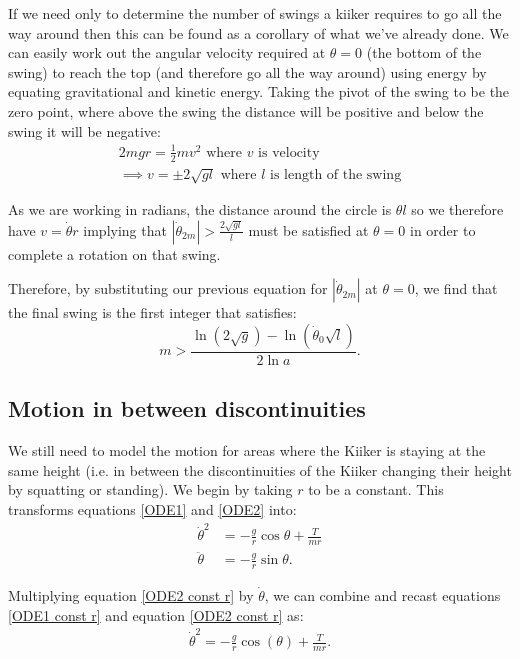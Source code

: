 \documentclass[12pt]{article}
\begin{document}
If we need only to determine the number of swings a kiiker requires to go all the way around then this can be found as a corollary of what we've already done. We can easily work out the angular velocity required at $\theta = 0$ (the bottom of the swing) to reach the top (and therefore go all the way around) using energy by equating gravitational and kinetic energy. Taking the pivot of the swing to be the zero point, where above the swing the distance will be positive and below the swing it will be negative:
\begin{align}
    2mgr = \frac{1}{2}mv^2 \,\, \text{where $v$ is velocity }\\
    \implies v = \pm 2\sqrt{gl} \,\, \text{where $l$ is length of the swing}
\end{align}

As we are working in radians, the distance around the circle is $\theta l$ so we therefore have $v = \dot{\theta}r$ implying that $|{\dot{\theta}_{2m}}| >  \frac{2\sqrt{gl}}{l}$ must be satisfied at $\theta = 0$ in order to complete a rotation on that swing.

Therefore, by substituting our previous equation for $|{\dot{\theta}_{2m}}|$ at $\theta = 0$, we find that the final swing is the first integer that satisfies:
\begin{equation}
    m >\frac{\ln\left({2 \sqrt{g}}\right) - \ln{\left(\dot{\theta}_0 \sqrt{l}\right)}}{2\ln{a}}.
\end{equation}

\subsection{Motion in between discontinuities}
We still need to model the motion for areas where the Kiiker is staying at the same height (i.e. in between the discontinuities of the Kiiker changing their height by squatting or standing). We begin by taking $r$ to be a constant. This transforms equations \ref{ODE1} and \ref{ODE2} into:
\begin{align}
    \dot{\theta}^2 &= -\frac{g}{r} \cos{\theta} + \frac{T}{mr} \label{ODE1 const r}
    \\\ddot{\theta} &= -\frac{g}{r}\sin{\theta}. \label{ODE2 const r}
\end{align}

Multiplying equation \ref{ODE2 const r} by $\dot{\theta}$, we can combine and recast equations \ref{ODE1 const r} and equation \ref{ODE2 const r} as:
\begin{align}
    \dot{\theta}^2 = -\frac{g}{r}\cos(\theta) + \frac{T}{mr}.
\end{align}
\end{document}
